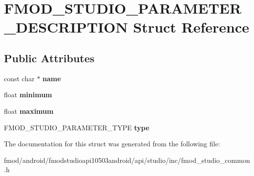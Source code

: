\hypertarget{struct_f_m_o_d___s_t_u_d_i_o___p_a_r_a_m_e_t_e_r___d_e_s_c_r_i_p_t_i_o_n}{\section{F\+M\+O\+D\+\_\+\+S\+T\+U\+D\+I\+O\+\_\+\+P\+A\+R\+A\+M\+E\+T\+E\+R\+\_\+\+D\+E\+S\+C\+R\+I\+P\+T\+I\+O\+N Struct Reference}
\label{struct_f_m_o_d___s_t_u_d_i_o___p_a_r_a_m_e_t_e_r___d_e_s_c_r_i_p_t_i_o_n}
}
\subsection*{Public Attributes}
\begin{DoxyCompactItemize}
\item 
\hypertarget{struct_f_m_o_d___s_t_u_d_i_o___p_a_r_a_m_e_t_e_r___d_e_s_c_r_i_p_t_i_o_n_ac2800a7a743731f2c2ee54d5d8fa8bff}{const char $\ast$ {\bfseries name}}\label{struct_f_m_o_d___s_t_u_d_i_o___p_a_r_a_m_e_t_e_r___d_e_s_c_r_i_p_t_i_o_n_ac2800a7a743731f2c2ee54d5d8fa8bff}

\item 
\hypertarget{struct_f_m_o_d___s_t_u_d_i_o___p_a_r_a_m_e_t_e_r___d_e_s_c_r_i_p_t_i_o_n_a22994f188f2773b794f5a82143df3afd}{float {\bfseries minimum}}\label{struct_f_m_o_d___s_t_u_d_i_o___p_a_r_a_m_e_t_e_r___d_e_s_c_r_i_p_t_i_o_n_a22994f188f2773b794f5a82143df3afd}

\item 
\hypertarget{struct_f_m_o_d___s_t_u_d_i_o___p_a_r_a_m_e_t_e_r___d_e_s_c_r_i_p_t_i_o_n_aa5871df27612240de72abe9bfc7cec02}{float {\bfseries maximum}}\label{struct_f_m_o_d___s_t_u_d_i_o___p_a_r_a_m_e_t_e_r___d_e_s_c_r_i_p_t_i_o_n_aa5871df27612240de72abe9bfc7cec02}

\item 
\hypertarget{struct_f_m_o_d___s_t_u_d_i_o___p_a_r_a_m_e_t_e_r___d_e_s_c_r_i_p_t_i_o_n_a3b7dc3fdc70ef221f8e0d0dbd4573a8d}{F\+M\+O\+D\+\_\+\+S\+T\+U\+D\+I\+O\+\_\+\+P\+A\+R\+A\+M\+E\+T\+E\+R\+\_\+\+T\+Y\+P\+E {\bfseries type}}\label{struct_f_m_o_d___s_t_u_d_i_o___p_a_r_a_m_e_t_e_r___d_e_s_c_r_i_p_t_i_o_n_a3b7dc3fdc70ef221f8e0d0dbd4573a8d}

\end{DoxyCompactItemize}


The documentation for this struct was generated from the following file\+:\begin{DoxyCompactItemize}
\item 
fmod/android/fmodstudioapi10503android/api/studio/inc/fmod\+\_\+studio\+\_\+common.\+h\end{DoxyCompactItemize}
